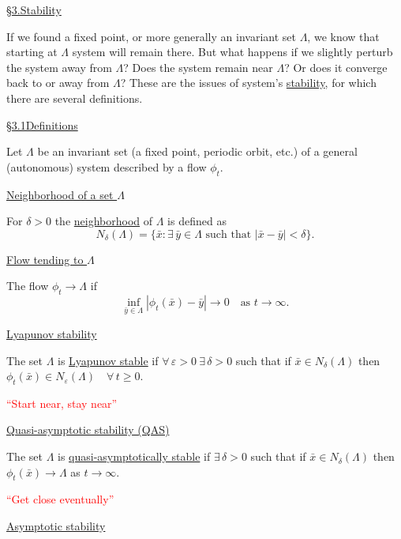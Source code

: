 \documentclass[11pt,a4paper]{article}
\begin{document}
\newpage
\noindent\underline{\S 3.\quad Stability}

\medskip
\noindent
If we found a fixed point, or more generally an invariant set $\Lambda$, we know
that starting at $\Lambda$ system will remain there. But what happens if we
slightly perturb the system away from $\Lambda$? Does the system remain near
$\Lambda$? Or does it converge back to or away from $\Lambda$? These are the
issues of system's \underline{stability}, for which there are several definitions.

\medskip
\noindent\underline{\S 3.1\quad Definitions}

\medskip
\noindent
Let $\Lambda$ be an invariant set (a fixed point, periodic orbit, etc.) of a
general (autonomous) system described by a flow $\phi_t$.

\medskip
\noindent{}\quad\underline{Neighborhood of a set $\Lambda$}

\medskip
\noindent For $\delta>0$ the \underline{neighborhood} of $\Lambda$ is defined as
\[
N_\delta(\Lambda)=\{\bar x:\exists\,\bar y\in\Lambda
\text{ such that }|\bar x-\bar y|<\delta\}.
\]

\noindent{}\quad\underline{Flow tending to $\Lambda$}

\medskip
\noindent The flow $\phi_t\to\Lambda$ if
\[
\inf_{\bar y\in\Lambda}|\phi_t(\bar x)-\bar y|\to0
\quad\text{as }t\to\infty.
\]

\noindent{}\quad\underline{Lyapunov stability}

\medskip
\noindent The set $\Lambda$ is \underline{Lyapunov stable} if
$\forall\,\varepsilon>0\ \exists\,\delta>0$ such that if
$\bar x\in N_\delta(\Lambda)$ then
$\phi_t(\bar x)\in N_\varepsilon(\Lambda)\quad\forall\,t\geq0$.

\smallskip
\noindent\textcolor{red}{``Start near, stay near''}

\medskip
\noindent{}\quad\underline{Quasi-asymptotic stability (QAS)}

\medskip
\noindent The set $\Lambda$ is \underline{quasi-asymptotically stable} if
$\exists\,\delta>0$ such that if $\bar x\in N_\delta(\Lambda)$ then
$\phi_t(\bar x)\to\Lambda$ as $t\to\infty$.

\smallskip
\noindent\textcolor{red}{``Get close eventually''}

\newpage
\noindent{}\quad\underline{Asymptotic stability}
\end{document}
